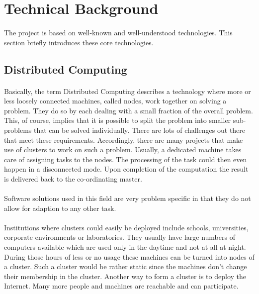 \section{Technical Background}%
\paragraph{}
The project is based on well-known and well-understood technologies. This section briefly introduces these core technologies.

\subsection{Distributed Computing}
\paragraph{}
Basically, the term Distributed Computing describes a technology where more or less loosely connected machines, called nodes, work together on solving a problem. They do so by each dealing with a small fraction of the overall problem. This, of course, implies that it is possible to split the problem into smaller sub-problems that can be solved individually. There are lots of challenges out there that meet these requirements. Accordingly, there are many projects that make use of clusters to work on such a problem. Usually, a dedicated machine takes care of assigning tasks to the nodes. The processing of the task could then even happen in a disconnected mode. Upon completion of the computation the result is delivered back to the co-ordinating master.

\paragraph{}
Software solutions used in this field are very problem specific in that they do not allow for adaption to any other task.

\paragraph{}
Institutions where clusters could easily be deployed include schools, universities, corporate environments or laboratories. They usually have large numbers of computers available which are used only in the daytime and not at all at night. During those hours of less or no usage these machines can be turned into nodes of a cluster. Such a cluster would be rather static since the machines don't change their membership in the cluster. Another way to form a cluster is to deploy the Internet. Many more people and machines are reachable and can participate.

